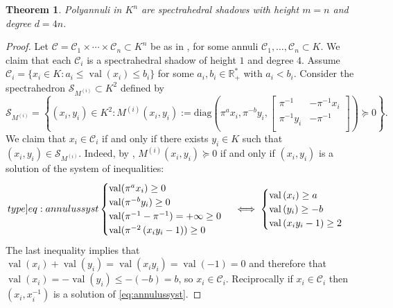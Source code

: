 \documentclass[a4paper,oneside,10pt]{article}
\newtheorem{theorem}{Theorem}[section]
\newcommand{\R}{\mathbb{R}} %
\DeclareMathOperator{\val}{val}
\def\diag{\mathrm{diag}}
\begin{document}
\begin{theorem}
Polyannuli in $K^n$ are spectrahedral shadows with height $m=n$ and degree $d=4n$.
\end{theorem}
\begin{proof}
  Let $\mathcal{C} = \mathcal{C}_1 \times \cdots \times \mathcal{C}_n \subset K^n$ be as in ,
  for some annuli $\mathcal{C}_1,\ldots,\mathcal{C}_n \subset K$. We claim that each $\mathcal{C}_i$ is a spectrahedral
  shadow of height $1$ and degree $4$. Assume $\mathcal{C}_i = \{x_i \in K : a_i \leq \val(x_i) \leq b_i\}$
  for some $a_i, b_i \in \R^*_+$ with $a_i < b_i$. Consider the spectrahedron
  $\mathcal{S}_{M^{(i)}} \subset K^2$ defined by
  $$
  \mathcal{S}_{M^{(i)}} = \left\{(x_i,y_i) \in K^2 :
  M^{(i)}(x_i,y_i) := \diag\left(\pi^a x_i, \pi^{-b} y_i,
  \begin{bmatrix}
    \pi^{-1} & -\pi^{-1} x_i  \\
    \pi^{-1} y_i & - \pi^{-1} \\
  \end{bmatrix}\right) \succeq 0
  \right\}.
  $$
  We claim that $x_i \in \mathcal{C}_i$ if and only if there exists $y_i \in K$ such that $(x_i,y_i) \in
  \mathcal{S}_{M^{(i)}}$.
  Indeed, by , $M^{(i)}(x_i,y_i) \succeq 0$ if and only if $(x_i,y_i)$ is a solution of the system
  of inequalities:
  \begin{equation}
    \label[type]{eq:annulussyst}
    \begin{cases}
      \val(\pi^a x_i) \ge 0 \\
  \val(\pi^{-b} y_i) \ge 0\\
  \val(\pi^{-1}- \pi^{-1}) = +\infty \ge 0\\
  \val(\pi^{-2}\left( x_iy_i-1 \right))  \ge 0 
\end{cases}
\iff	
\begin{cases} 
  \val\left(x_i\right)\ge a\\
  \val\left(y_i\right)\ge -b\\
  \val\left(x_iy_i-1 \right) \ge 2
\end{cases}
\end{equation} 
  The last inequality implies that $\val\left(x_i\right)+\val\left(y_i\right)=\val\left(x_iy_i\right) = \val\left(-1\right) =0$ and therefore that $\val\left(x_i\right)=-\val\left(y_i\right)\le -(-b) = b$, so $x_i \in \mathcal{C}_i$. 
Reciprocally if $x_i \in \mathcal{C}_i$ then $(x_i,x_i^{-1})$ is a solution of \eqref{eq:annulussyst}.

\end{proof}
\end{document}
